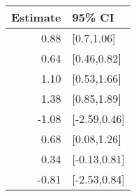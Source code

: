 \begin{tabular}{rl}
  \hline
Estimate & 95\% CI \\ 
  \hline
0.88 & [0.7,1.06] \\ 
  0.64 & [0.46,0.82] \\ 
  1.10 & [0.53,1.66] \\ 
  1.38 & [0.85,1.89] \\ 
  -1.08 & [-2.59,0.46] \\ 
  0.68 & [0.08,1.26] \\ 
  0.34 & [-0.13,0.81] \\ 
  -0.81 & [-2.53,0.84] \\ 
   \hline
\end{tabular}

